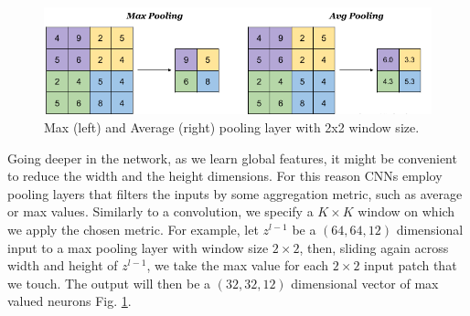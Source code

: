 \documentclass[LaM,binding=0.6cm]{./packages/sapthesis/sapthesis}
\begin{document}
            \begin{figure}[b!]
                \centering
                \includegraphics[scale=0.30]{pooling}
                \caption{Max (left) and Average (right) pooling layer with 2x2 window size.}
                \label{fig:pooling}
            \end{figure}
            Going deeper in the network, as we learn global features, it might be convenient to reduce the width and the height dimensions. For this reason CNNs employ pooling layers
            that filters the inputs by some aggregation metric, such as average or max values. Similarly to a convolution, we specify a 
            $ K \times K $ window on which we apply the chosen metric. For example, let $z^{l-1}$ be a $(64,64,12)$ dimensional
            input to a max pooling layer with window size $2\times2$, then, sliding again across width and height of $z^{l-1}$, we take the max value for each
            $ 2 \times 2 $ input patch that we touch. The output will then be a $ (32, 32, 12) $ dimensional vector of max valued neurons Fig. \ref{fig:pooling}. 
\end{document}
